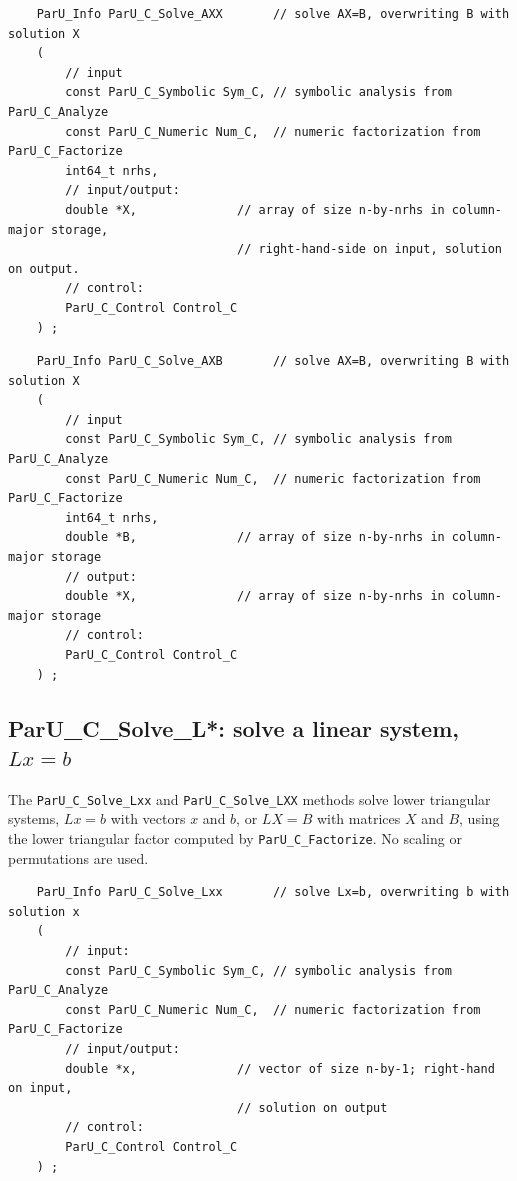 \documentclass[12pt]{article}
\begin{document}
    {\footnotesize
    \begin{verbatim}
    ParU_Info ParU_C_Solve_AXX       // solve AX=B, overwriting B with solution X
    (
        // input
        const ParU_C_Symbolic Sym_C, // symbolic analysis from ParU_C_Analyze
        const ParU_C_Numeric Num_C,  // numeric factorization from ParU_C_Factorize
        int64_t nrhs,
        // input/output:
        double *X,              // array of size n-by-nrhs in column-major storage,
                                // right-hand-side on input, solution on output.
        // control:
        ParU_C_Control Control_C
    ) ; \end{verbatim} }

    {\footnotesize
    \begin{verbatim}
    ParU_Info ParU_C_Solve_AXB       // solve AX=B, overwriting B with solution X
    (
        // input
        const ParU_C_Symbolic Sym_C, // symbolic analysis from ParU_C_Analyze
        const ParU_C_Numeric Num_C,  // numeric factorization from ParU_C_Factorize
        int64_t nrhs,
        double *B,              // array of size n-by-nrhs in column-major storage
        // output:
        double *X,              // array of size n-by-nrhs in column-major storage
        // control:
        ParU_C_Control Control_C
    ) ; \end{verbatim} }

\subsection{{\sf ParU\_C\_Solve\_L*}: solve a linear system, $Lx=b$}

    The \verb'ParU_C_Solve_Lxx' and \verb'ParU_C_Solve_LXX' methods solve lower
    triangular systems, $Lx=b$ with vectors $x$ and $b$, or $LX=B$ with
    matrices $X$ and $B$, using the lower triangular factor computed by
    \verb'ParU_C_Factorize'.  No scaling or permutations are used.

    {\footnotesize
    \begin{verbatim}
    ParU_Info ParU_C_Solve_Lxx       // solve Lx=b, overwriting b with solution x
    (
        // input:
        const ParU_C_Symbolic Sym_C, // symbolic analysis from ParU_C_Analyze
        const ParU_C_Numeric Num_C,  // numeric factorization from ParU_C_Factorize
        // input/output:
        double *x,              // vector of size n-by-1; right-hand on input,
                                // solution on output
        // control:
        ParU_C_Control Control_C
    ) ; \end{verbatim} }
\end{document}
